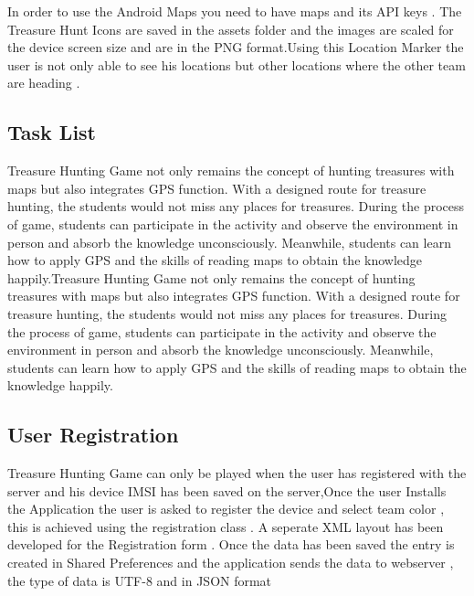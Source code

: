 \documentclass[12pt,a4paper,times]{report}
\begin{document}
In order to use the Android Maps you need to have maps and its API keys . The Treasure Hunt Icons are saved in the assets folder and the images are scaled for the device screen size and are in the PNG format.Using this Location Marker the user is not only able to see his locations but other locations where the other team are heading .




%

\subsection{Task List}

Treasure Hunting Game not only remains the concept of hunting treasures with maps but also integrates GPS function. With a designed route for treasure hunting, the students would not miss any places for treasures. During the process of game, students can participate in the activity and observe the environment in person and absorb the knowledge unconsciously. Meanwhile, students can learn how to apply GPS and the skills of reading maps to obtain the knowledge happily.Treasure Hunting Game not only remains the concept of hunting treasures with maps but also integrates GPS function. With a designed route for treasure hunting, the students would not miss any places for treasures. During the process of game, students can participate in the activity and observe the environment in person and absorb the knowledge unconsciously. Meanwhile, students can learn how to apply GPS and the skills of reading maps to obtain the knowledge happily.



%


\subsection{User Registration}

Treasure Hunting Game can only be played when the user has registered with the server and his device IMSI has been saved on the server,Once the user Installs the Application the user is asked to register the device and select team color , this is achieved using the registration class . A seperate XML layout has been developed for the Registration form . Once the data has been saved the entry is created in Shared Preferences and the application sends the data to webserver , the type of data is UTF-8 and in JSON format
\end{document}
